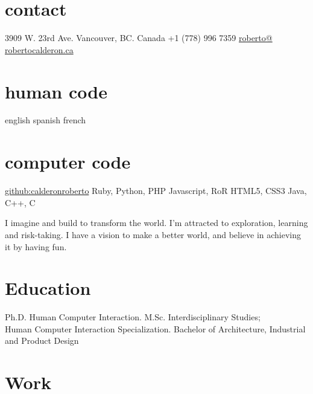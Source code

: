 \documentclass[full]{rvca}
\begin{document}
 



 
\begin{aside} %
\section{contact}
3909 W. 23rd Ave.
Vancouver, BC.
Canada
+1 (778) 996 7359
\href{http://robertocalderon.ca}{roberto@\\robertocalderon.ca}
\QrCode
\section{human code}
english
spanish
french
\section{computer code}
\href{https://github.com/calderonroberto}{github:calderonroberto}
Ruby, Python, PHP
Javascript, RoR \NinjaIcon
HTML5, CSS3 
Java, C++, C
\end{aside}
 
\begin{statement}
I imagine and build to transform the world. I'm attracted to exploration, learning and risk-taking. I have a vision to make a better world, and believe in achieving it by having fun.
\end{statement}

\section{Education}
Ph.D. Human Computer Interaction.
M.Sc. Interdisciplinary Studies;\\Human Computer Interaction Specialization.
Bachelor of Architecture, Industrial and Product Design

\section{Work}

\end{document}
